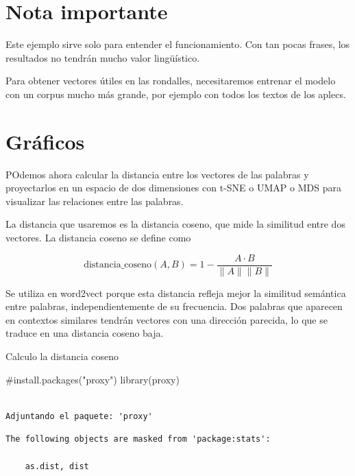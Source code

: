 \documentclass[
  letterpaper,
  DIV=11,
  numbers=noendperiod]{scrreprt}
\newenvironment{Shaded}{\begin{snugshade}}{\end{snugshade}}
\newcommand{\CommentTok}[1]{\textcolor[rgb]{0.37,0.37,0.37}{#1}}
\newcommand{\FunctionTok}[1]{\textcolor[rgb]{0.28,0.35,0.67}{#1}}
\newcommand{\NormalTok}[1]{\textcolor[rgb]{0.00,0.23,0.31}{#1}}
\begin{document}
\section{Nota importante}\label{nota-importante}

Este ejemplo sirve solo para entender el funcionamiento. Con tan pocas
frases, los resultados no tendrán mucho valor lingüístico.

Para obtener vectores útiles en las rondalles, necesitaremos entrenar el
modelo con un corpus mucho más grande, por ejemplo con todos los textos
de los aplecs.

\section{Gráficos}\label{gruxe1ficos}

POdemos ahora calcular la distancia entre los vectores de las palabras y
proyectarlos en un espacio de dos dimensiones con t-SNE o UMAP o MDS
para visualizar las relaciones entre las palabras.

La distancia que usaremos es la distancia coseno, que mide la similitud
entre dos vectores. La distancia coseno se define como

\[
\text{distancia\_coseno}(A, B) = 1 - \frac{A \cdot B}{\|A\| \|B\|}
\]

Se utiliza en word2vect porque esta distancia refleja mejor la similitud
semántica entre palabras, independientemente de su frecuencia. Dos
palabras que aparecen en contextos similares tendrán vectores con una
dirección parecida, lo que se traduce en una distancia coseno baja.

Calculo la distancia coseno

\begin{Shaded}
\begin{Highlighting}[]
\CommentTok{\#install.packages("proxy")}
\FunctionTok{library}\NormalTok{(proxy)}
\end{Highlighting}
\end{Shaded}

\begin{verbatim}

Adjuntando el paquete: 'proxy'
\end{verbatim}

\begin{verbatim}
The following objects are masked from 'package:stats':

    as.dist, dist
\end{verbatim}
\end{document}
